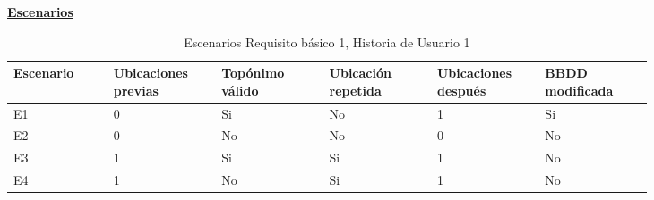 \documentclass[../ei103948-project-documentation.tex]{subfiles}
\begin{document}
					\begin{center}
					\textbf{\underline{Escenarios}}
					\begin{table}[H]
						\centering
						\begin{tabular}{|p{0.13\linewidth}|p{0.14\linewidth}|p{0.14\linewidth}|p{0.14\linewidth}|p{0.14\linewidth}|p{0.14\linewidth}|}
						\hline
						\textbf{Escenario} & \textbf{Ubicaciones previas} & \textbf{Topónimo válido} & \textbf{Ubicación repetida} & \textbf{Ubicaciones después} & \textbf{BBDD modificada} \\ \hline
						E1                 & 0                        & Si                       & No                      & 1                        & Si                       \\ \hline
						E2                 & 0                        & No                       & No                      & 0                        & No                       \\ \hline
						E3                 & 1                        & Si                       & Si                      & 1                        & No                       \\ \hline
						E4                 & 1                        & No                       & Si                      & 1                        & No                       \\ \hline
						\end{tabular}
						\caption{Escenarios Requisito básico 1, Historia de Usuario 1}
					\end{table}

					\descripcionBasicaA


\end{center}
\end{document}
